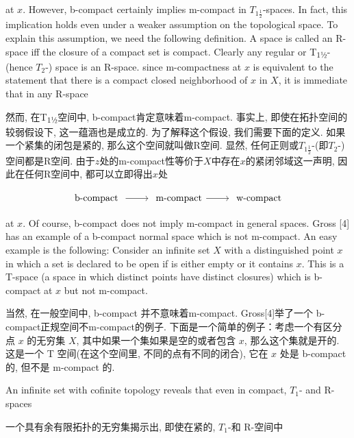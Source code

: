\documentclass[options]{article}
\begin{document}
\begin{paracol}{2}
	\begin{en}
		\noindent at $x$. However, b-compact certainly implies m-compact in $T_{1
				\frac{1}{2}}$-spaces. In fact, this implication holds even under a weaker assumption on
		the topological space. To explain this assumption, we need the following definition. A
		space is called an R-space iff the closure of a compact set is compact. Clearly any
		regular or T\textsubscript{\!$1$½}-(hence $T_{2}$-) space is an R-space. since
		m-compactness at $x$ is equivalent to the statement that there is a compact
		closed neighborhood of $x$ in $X$, it is immediate that in any R-space
	\end{en}
	\begin{cn}
		\noindent 然而, 在T\textsubscript{\!$1$½}空间中, b-compact肯定意味着m-compact. 事实上, 即使在拓扑空间的较弱假设下, 这一蕴涵也是成立的. 为了解释这个假设, 我们需要下面的定义. 如果一个紧集的闭包是紧的, 那么这个空间就叫做R空间. 显然, 任何正则或$T_{1\frac{1}{2}}$-(即$T_{2}$-)空间都是R空间. 由于$z$处的m-compact性等价于$X$中存在$x$的紧闭邻域这一声明, 因此在任何R空间中, 都可以立即得出$x$处
	\end{cn}
\end{paracol}
\[
		\begin{tikzcd}
			\text{ b-compact }\ar[r]&\text { m-compact}\ar[r]& \text { w-compact }
		\end{tikzcd}
\]
\begin{paracol}{2}
	\begin{en}
		at $x$. Of course, b-compact does not imply m-compact in general spaces.
		Gross [4] has an example of a b-compact normal space which is not m-compact.
		An easy example is the following: Consider an infinite set $X$ with a
		distinguished point $x$ in which a set is declared to be open if is either
		empty or it contains $x$. This is a T\textsubscript{}-space (a space in which
		distinct points have distinct closures) which is b-compact at $x$ but not
		m-compact.
	\end{en}
	\begin{cn}
		当然, 在一般空间中, b-compact 并不意味着m-compact. Gross[4]举了一个 b-compact正规空间不m-compact的例子. 下面是一个简单的例子：考虑一个有区分点 $x$ 的无穷集 $X$, 其中如果一个集如果是空的或者包含 $x$, 那么这个集就是开的. 这是一个 T\textsubscript{} 空间(在这个空间里, 不同的点有不同的闭合), 它在 $x$ 处是 b-compact 的, 但不是 m-compact 的.
	\end{cn}
	\begin{en}
		An infinite set with cofinite topology reveals that even in compact, $T_1$- and R-spaces

	\end{en}
	\begin{cn}
		一个具有余有限拓扑的无穷集揭示出, 即使在紧的, $T_1$-和 R-空间中
	\end{cn}
\end{paracol}
\end{document}
